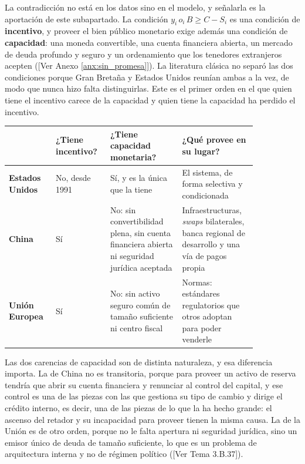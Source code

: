 \documentclass[10pt,a4paper]{article}
\newcommand{\authorfont}[1]{{\fontfamily{EBGaramond-TLF}\selectfont #1}}
\begin{document}
La contradicción no está en los datos sino en el modelo, y señalarla es la aportación de este subapartado. La condición $y_i\,o_i\,B\geq C-S_i$ es una condición de \textbf{incentivo}, y proveer el bien público monetario exige además una condición de \textbf{capacidad}: una moneda convertible, una cuenta financiera abierta, un mercado de deuda profundo y seguro y un ordenamiento que los tenedores extranjeros acepten ([\authorfont{Ver Anexo \ref{anx:sin_promesa}}]). La literatura clásica no separó las dos condiciones porque Gran Bretaña y Estados Unidos reunían ambas a la vez, de modo que nunca hizo falta distinguirlas. Este es el primer orden en el que quien tiene el incentivo carece de la capacidad y quien tiene la capacidad ha perdido el incentivo.

\begin{center}
{\footnotesize
\begin{tabular}{|p{0.15\linewidth}|p{0.17\linewidth}|p{0.26\linewidth}|p{0.26\linewidth}|}
\hline
 & \textbf{¿Tiene incentivo?} & \textbf{¿Tiene capacidad monetaria?} & \textbf{¿Qué provee en su lugar?} \\
\hline
\textbf{Estados Unidos} & No, desde 1991 & Sí, y es la única que la tiene & El sistema, de forma selectiva y condicionada \\
\hline
\textbf{China} & Sí & No: sin convertibilidad plena, sin cuenta financiera abierta ni seguridad jurídica aceptada & Infraestructuras, \textit{swaps} bilaterales, banca regional de desarrollo y una vía de pagos propia \\
\hline
\textbf{Unión Europea} & Sí & No: sin activo seguro común de tamaño suficiente ni centro fiscal & Normas: estándares regulatorios que otros adoptan para poder venderle \\
\hline
\end{tabular}}
\end{center}

Las dos carencias de capacidad son de distinta naturaleza, y esa diferencia importa. La de China no es transitoria, porque para proveer un activo de reserva tendría que abrir su cuenta financiera y renunciar al control del capital, y ese control es una de las piezas con las que gestiona su tipo de cambio y dirige el crédito interno, es decir, una de las piezas de lo que la ha hecho grande: el ascenso del retador y su incapacidad para proveer tienen la misma causa. La de la Unión es de otro orden, porque no le falta apertura ni seguridad jurídica, sino un emisor único de deuda de tamaño suficiente, lo que es un problema de arquitectura interna y no de régimen político ([\authorfont{Ver Tema 3.B.37}]).
\end{document}
